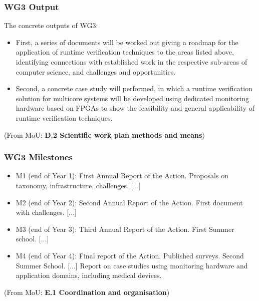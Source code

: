 \documentclass{beamer}
\begin{document}
\begin{frame}
  \frametitle{WG3 Output}

  The \alert{concrete outputs} of WG3:
  \begin{itemize}
  \item First, a series of documents will be worked out giving a
    \alert{roadmap} for the application of runtime verification techniques to
    the areas listed above, identifying connections with established
    work in the respective sub-areas of computer science, and
    challenges and opportunities. 
  \item Second, a \alert{concrete case study} will performed, in which
    a runtime verification solution for multicore systems will be
    developed using dedicated monitoring hardware based on FPGAs to
    show the feasibility and general applicability of runtime
    verification techniques.
  \end{itemize}

  \bigskip

  {\small (From MoU: \textbf{D.2 Scientific work plan methods and means})}
  
\end{frame}

\begin{frame}
  \frametitle{WG3 Milestones}

  
\begin{itemize}
\item M1 (end of Year 1): First Annual Report of the Action. Proposals
  on taxonomy, infrastructure, \alert{challenges}. [...]
\item M2 (end of Year 2): Second Annual Report of the Action.
  \alert{First document with challenges}. [...]
\item M3 (end of Year 3): Third Annual Report of the Action. First
  Summer school. [...]
\item M4 (end of Year 4): Final report of the Action. \alert{Published
    surveys}. Second Summer School. [...] Report on case studies using
  monitoring hardware and application domains, including medical
  devices.
\end{itemize}

\bigskip

  {\small (From MoU: \textbf{E.1 Coordination and organisation})}



\end{frame}
\end{document}
